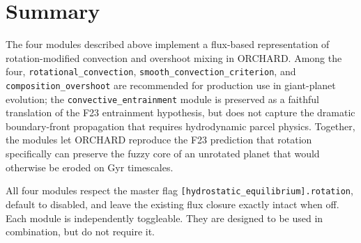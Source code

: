 \documentclass{aastex631}
\begin{document}
\section{Summary}\label{sec:summary}

The four modules described above implement a flux-based representation
of rotation-modified convection and overshoot mixing in ORCHARD.
Among the four, \texttt{rotational\_convection},
\texttt{smooth\_convection\_criterion}, and
\texttt{composition\_overshoot} are recommended for production use in
giant-planet evolution; the \texttt{convective\_entrainment} module is
preserved as a faithful translation of the F23 entrainment hypothesis,
but does not capture the dramatic boundary-front propagation that
requires hydrodynamic parcel physics.  Together, the modules let ORCHARD
reproduce the F23 prediction that rotation specifically can preserve
the fuzzy core of an unrotated planet that would otherwise be eroded
on Gyr timescales.

All four modules respect the master flag
\texttt{[hydrostatic\_equilibrium].rotation}, default to disabled,
and leave the existing flux closure exactly intact when off.  Each
module is independently toggleable.  They are designed to be used in
combination, but do not require it.



\end{document}
